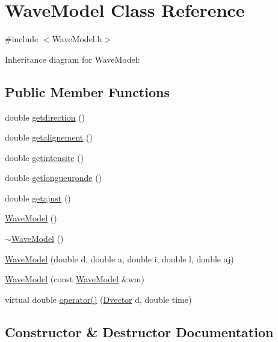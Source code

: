 \hypertarget{class_wave_model}{}\section{Wave\+Model Class Reference}
\label{class_wave_model}


{\ttfamily \#include $<$Wave\+Model.\+h$>$}



Inheritance diagram for Wave\+Model\+:
\subsection*{Public Member Functions}
\begin{DoxyCompactItemize}
\item 
double \hyperlink{class_wave_model_a92f0e3085214c1ec12001c101ade4bbb}{getdirection} ()
\item 
double \hyperlink{class_wave_model_a703f7a4fc4e0f39c50bcc617185345cd}{getalignement} ()
\item 
double \hyperlink{class_wave_model_a617552255102d1e5577857ba20a75608}{getintensite} ()
\item 
double \hyperlink{class_wave_model_abadf2dd605e84c5517334d21f4b9d6ad}{getlongueuronde} ()
\item 
double \hyperlink{class_wave_model_a44f612a070b68302d8efada0a1f329b6}{getajust} ()
\item 
\hyperlink{class_wave_model_a3bf52f16322370656b8711a68ce5d194}{Wave\+Model} ()
\item 
\hyperlink{class_wave_model_a83b17b2ec70b9ace55d5b3872f75dcce}{$\sim$\+Wave\+Model} ()
\item 
\hyperlink{class_wave_model_a1f5b077c2b18211da1c035bb23e78c3f}{Wave\+Model} (double d, double a, double i, double l, double aj)
\item 
\hyperlink{class_wave_model_ac100f5a6391505dd8401131cfa9eafa7}{Wave\+Model} (const \hyperlink{class_wave_model}{Wave\+Model} \&wm)
\item 
virtual double \hyperlink{class_wave_model_a146538a4e65a3261f3b0d21bb38344c0}{operator()} (\hyperlink{class_dvector}{Dvector} d, double time)
\end{DoxyCompactItemize}


\subsection{Constructor \& Destructor Documentation}
